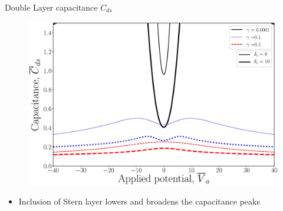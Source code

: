 \documentclass{beamer}
\begin{document}
\begin{frame}{Double Layer capacitance $C_{ds}$}
    \begin{figure}[!h]
    \begin{center}
    \includegraphics[scale=0.2]{figure_3c.eps}
    \end{center}
    \end{figure}
\begin{itemize}
    \item Inclusion of Stern layer lowers and broadens the capacitance peaks 
\end{itemize}{}
\end{frame}{}
\end{document}
